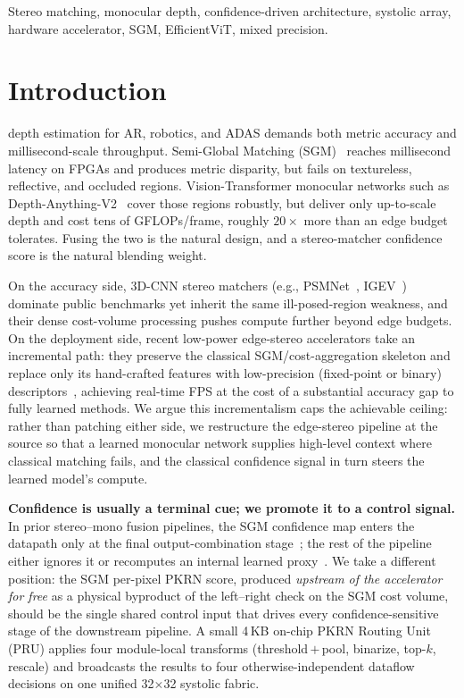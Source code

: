 \documentclass[journal,twocolumn]{IEEEtran}
\begin{document}
\begin{IEEEkeywords}
Stereo matching, monocular depth, confidence-driven architecture, systolic array, hardware accelerator, SGM, EfficientViT, mixed precision.
\end{IEEEkeywords}

\section{Introduction}
\label{sec:intro}
 depth estimation for AR, robotics, and ADAS demands both metric accuracy and millisecond-scale throughput. Semi-Global Matching (SGM)~\cite{hirschmuller2008sgm} reaches millisecond latency on FPGAs and produces metric disparity, but fails on textureless, reflective, and occluded regions. Vision-Transformer monocular networks such as Depth-Anything-V2~\cite{yang2024da2} cover those regions robustly, but deliver only up-to-scale depth and cost tens of GFLOPs/frame, roughly $20\times$ more than an edge budget tolerates. Fusing the two is the natural design, and a stereo-matcher confidence score is the natural blending weight.

On the accuracy side, 3D-CNN stereo matchers (e.g., PSMNet~\cite{chang2018psmnet}, IGEV~\cite{xu2023igev}) dominate public benchmarks yet inherit the same ill-posed-region weakness, and their dense cost-volume processing pushes compute further beyond edge budgets. On the deployment side, recent low-power edge-stereo accelerators take an incremental path: they preserve the classical SGM/cost-aggregation skeleton and replace only its hand-crafted features with low-precision (fixed-point or binary) descriptors~\cite{zhao2020fpstereo}, achieving real-time FPS at the cost of a substantial accuracy gap to fully learned methods. We argue this incrementalism caps the achievable ceiling: rather than patching either side, we restructure the edge-stereo pipeline at the source so that a learned monocular network supplies high-level context where classical matching fails, and the classical confidence signal in turn steers the learned model's compute.

\textbf{Confidence is usually a terminal cue; we promote it to a control signal.} In prior stereo--mono fusion pipelines, the SGM confidence map enters the datapath only at the final output-combination stage~\cite{poggi2016pkrn,facil2019camconvs}; the rest of the pipeline either ignores it or recomputes an internal learned proxy~\cite{you2023vitcod,wang2021spatten}. We take a different position: the SGM per-pixel PKRN score, produced \emph{upstream of the accelerator for free} as a physical byproduct of the left--right check on the SGM cost volume, should be the single shared control input that drives every confidence-sensitive stage of the downstream pipeline. A small 4\,KB on-chip PKRN Routing Unit (PRU) applies four module-local transforms (threshold\,$+$\,pool, binarize, top-$k$, rescale) and broadcasts the results to four otherwise-independent dataflow decisions on one unified 32$\times$32 systolic fabric.
\end{document}
